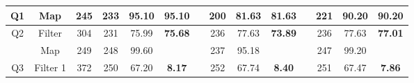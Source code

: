 \begin{table}
\begin{tabular}{cccccccccccccc}
Q1                              & Map                                 & 245                             & 233                                                                     & 95.10                                                                      & \textbf{95.10}                  &           & 200                                                                     & 81.63                                                                      & \textbf{81.63}                  &           & 221                                                                     & 90.20                                                                      & \textbf{90.20}                  \\ \hline
\multirow{2}{*}{Q2}             & Filter                              & 304                             & 231                                                                     & 75.99                                                                      & \multirow{2}{*}{\textbf{75.68}} &           & 236                                                                     & 77.63                                                                      & \multirow{2}{*}{\textbf{73.89}} &           & 236                                                                     & 77.63                                                                      & \multirow{2}{*}{\textbf{77.01}} \\
                                & Map                                 & 249                             & 248                                                                     & 99.60                                                                      &                                 &           & 237                                                                     & 95.18                                                                      &                                 &           & 247                                                                     & 99.20                                                                      &                                 \\ \hline
\multirow{4}{*}{Q3}             & Filter 1                            & 372                             & 250                                                                     & 67.20                                                                      & \multirow{4}{*}{\textbf{8.17}}  &           & 252                                                                     & 67.74                                                                      & \multirow{4}{*}{\textbf{8.40}}  &           & 251                                                                     & 67.47                                                                      & \multirow{4}{*}{\textbf{7.86}}  \\

\end{tabular}
\end{table}
